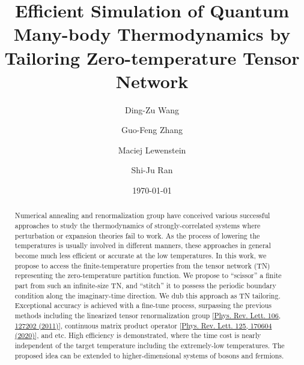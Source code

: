\documentclass[aps,prl,twocolumn,superscriptaddress,a4paper,english,longbibliography]{revtex4-1}
\begin{document}
	
	
\title{Efficient Simulation of Quantum Many-body Thermodynamics by Tailoring Zero-temperature Tensor Network}

\author{Ding-Zu Wang}

\author{Guo-Feng Zhang}

\author{Maciej Lewenstein}

\author{Shi-Ju Ran}
\date{\today}

\begin{abstract}
	Numerical annealing and renormalization group have conceived various successful approaches to study the thermodynamics of strongly-correlated systems where perturbation or expansion theories fail to work. As the process of lowering the temperatures is usually involved in different manners, these approaches in general become much less efficient or accurate at the low temperatures. In this work, we propose to access the finite-temperature properties from the tensor network (TN) representing the zero-temperature partition function. We propose to ``scissor'' a finite part from such an infinite-size TN, and ``stitch'' it to possess the periodic boundary condition along the imaginary-time direction. We dub this approach as TN tailoring. Exceptional accuracy is achieved with a fine-tune process, surpassing the previous methods including the linearized tensor renormalization group [\href{https://link.aps.org/doi/10.1103/PhysRevLett.106.127202}{Phys. Rev. Lett. 106, 127202 (2011)}], continuous matrix product operator [\href{https://link.aps.org/doi/10.1103/PhysRevLett.125.170604}{Phys. Rev. Lett. 125, 170604 (2020)}], and etc. High efficiency is demonstrated, where the time cost is nearly independent of the target temperature including the extremely-low temperatures. The proposed idea can be extended to higher-dimensional systems of bosons and fermions. 
\end{abstract}
\end{document}
